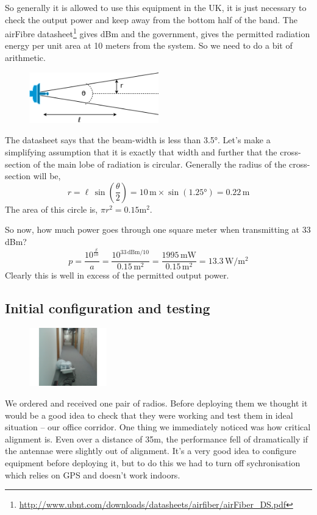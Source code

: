 So generally it is allowed to use this equipment in the UK, it is
just necessary to check the output power and keep away from the bottom
half of the band. The airFibre datasheet\footnote{\url{http://www.ubnt.com/downloads/datasheets/airfiber/airFiber_DS.pdf}}
gives dBm and the
government, gives the permitted radiation energy per unit area at 10
meters from the system. So we need to do a bit of arithmetic.
\begin{figure}
\includegraphics[width=0.5\textwidth]{radiation-cone}
\end{figure}

The datasheet says that the beam-width is less than 3.5°. Let's make a
simplifying assumption that it is exactly that width and further that
the cross-section of the main lobe of radiation is circular. Generally
the radius of the cross-section will be,
\begin{equation}
r = \ell\, \sin(\frac{\theta}{2}) = 10\,\text{m} \times \sin(1.25°) = 0.22\,\text{m}
\end{equation}
The area of this circle is, $\pi r^2 = 0.15 \text{m}^2$.

So now, how much power goes through one square meter when
transmitting at 33 dBm?
\begin{equation}
p = \frac{10^{\frac{\beta}{10}}}{a}  = \frac{10 ^ {33\,\text{dBm}/10}}{0.15\,\text{m}^2} = 
\frac{1995\,\text{mW}}{0.15\,\text{m}^2} = 13.3\,\text{W}/\text{m}^2
\end{equation}
Clearly this is well in excess of the permitted output power.

\subsection{Initial configuration and testing}
\label{december-2013-initial-configuration-and-testing}

\begin{figure}
\includegraphics[width=0.3\textwidth]{radio-in-corridor}
\end{figure}
We ordered and received one pair of radios. Before deploying them
we thought it would be a good idea to check that they were working
and test them in ideal situation -- our office corridor. One thing
we immediately noticed was how critical alignment is. Even over
a distance of 35m, the performance fell of dramatically if the
antennae were slightly out of alignment. It's a very good idea to
configure equipment before deploying it, but to do this we had to turn
off sychronisation which relies on GPS and doesn't work indoors.

